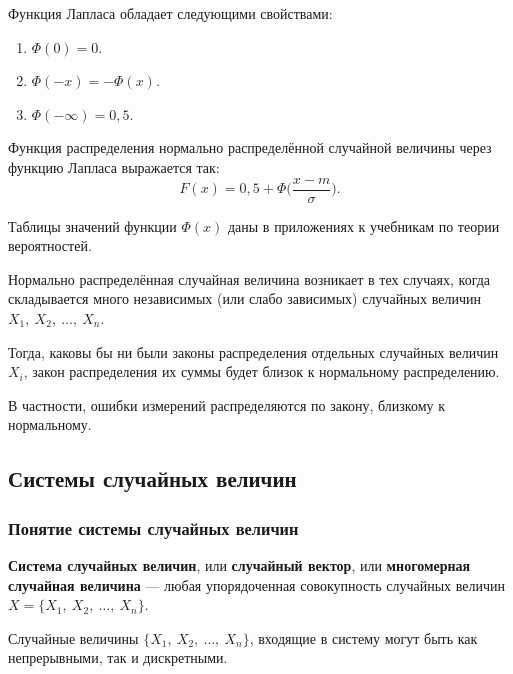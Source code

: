 \documentclass[a4paper]{article}
\newcommand{\key}[1]{{\color{Medium}\bfseries #1}}
\begin{document}
                    Функция Лапласа обладает следующими свойствами:
                    \begin{enumerate}
                        \item $\Phi (0) = 0$.
                        \item $\Phi (-x) = -\Phi (x)$.
                        \item $\Phi (-\infty) = 0,5$.
                    \end{enumerate}

                    Функция распределения нормально распределённой случайной величины через функцию Лапласа выражается так:
                    \begin{equation*}
                        F(x) = 0,5 + \Phi \Big( \frac{x - m}{\sigma} \Big) .
                    \end{equation*}

                    Таблицы значений функции $\Phi (x)$ даны в приложениях к учебникам по теории вероятностей.

                    Нормально распределённая случайная величина возникает в тех случаях, когда складывается много независимых (или слабо зависимых) случайных величин $X_1 , \: X_2 , \: \ldots , \: X_n$.
                    
                    Тогда, каковы бы ни были законы распределения отдельных случайных величин $X_i$, закон распределения их суммы будет близок к нормальному распределению.
                    
                    В частности, ошибки измерений распределяются по закону, близкому к нормальному.

        \newpage
        
        \subsection{Системы случайных величин}

            \subsubsection{Понятие системы случайных величин}

                \key{Система случайных величин}, или \key{случайный вектор}, или \key{многомерная случайная величина} --- любая упорядоченная совокупность случайных величин $X = \{ X_1 , \: X_2 , \: \ldots , \: X_n \}$.

                Случайные величины $\{ X_1 , \: X_2 , \: \ldots , \: X_n \}$, входящие в систему могут быть как непрерывными, так и дискретными.
                
\end{document}
